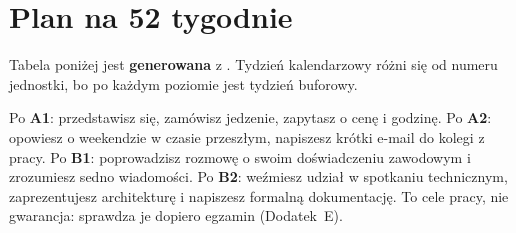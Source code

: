 \chapter*{Plan na 52 tygodnie}

Tabela poniżej jest \textbf{generowana} z . Tydzień kalendarzowy różni się od
numeru jednostki, bo po każdym poziomie jest tydzień buforowy.



\begin{uwaga}
Po \textbf{A1}: przedstawisz się, zamówisz jedzenie, zapytasz o cenę i godzinę. Po \textbf{A2}: opowiesz
o weekendzie w czasie przeszłym, napiszesz krótki e-mail do kolegi z pracy. Po \textbf{B1}: poprowadzisz
rozmowę o swoim doświadczeniu zawodowym i zrozumiesz sedno wiadomości. Po \textbf{B2}: weźmiesz udział
w spotkaniu technicznym, zaprezentujesz architekturę i napiszesz formalną dokumentację.
To cele pracy, nie gwarancja: sprawdza je dopiero egzamin (Dodatek~E).
\end{uwaga}
